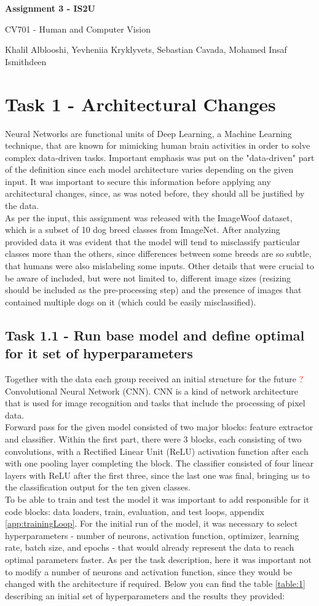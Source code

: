 \documentclass{article} %
\newcommand{\maketitletwo}[2][]{
\begin{center}
        \Large{\textbf{Assignment 3 - #2}
            
            CV701 - Human and Computer Vision} %
        \vspace{5pt}
        
        \normalsize{Khalil Alblooshi, Yevheniia Kryklyvets,
                    Sebastian Cavada, Mohamed Insaf Ismithdeen  %
        
        }      
        \vspace{10pt}       
\end{center}
}
\begin{document}
\maketitletwo[1]{IS2U}  %

\section*{Task 1 - Architectural Changes}

Neural Networks are functional units of Deep Learning, a Machine Learning technique, that are known for mimicking human brain activities in order to solve complex data-driven tasks. Important emphasis was put on the "data-driven" part of the definition since each model architecture varies depending on the given input. It was important to secure this information before applying any architectural changes, since, as was noted before, they should all be justified by the data. \\
As per the input, this assignment was released with the ImageWoof dataset, which is a subset of 10 dog breed classes from ImageNet. After analyzing provided data it was evident that the model will tend to misclassify particular classes more than the others, since differences between some breeds are so subtle, that humans were also mislabeling some inputs. Other details that were crucial to be aware of included, but were not limited to, different image sizes (resizing should be included as the pre-processing step) and the presence of images that contained multiple dogs on it (which could be easily misclassified).

\subsection*{Task 1.1 - Run base model and define optimal for it set of hyperparameters}

Together with the data each group received an initial structure for the future \textcolor{red}{?}
 Convolutional Neural Network (CNN). CNN is a kind of network architecture that is used for image recognition and tasks that include the processing of pixel data. \\
Forward pass for the given model consisted of two major blocks: feature extractor and classifier. Within the first part, there were 3 blocks, each consisting of two convolutions, with a Rectified Linear Unit (ReLU) activation function after each with one pooling layer completing the block. The classifier consisted of four linear layers with ReLU after the first three, since the last one was final, bringing us to the classification output for the ten given classes. \\
To be able to train and test the model it was important to add responsible for it code blocks: data loaders, train, evaluation, and test loops, appendix \ref{app:trainingLoop}.
For the initial run of the model, it was necessary to select hyperparameters - number of neurons, activation function, optimizer, learning rate, batch size, and epochs - that would already represent the data to reach optimal parameters faster. As per the task description, here it was important not to modify a number of neurons and activation function, since they would be changed with the architecture if required. Below you can find the table \ref{table:1} describing an initial set of hyperparameters and the results they provided:
\end{document}
